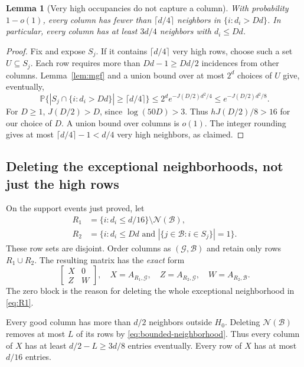 \documentclass[11pt]{article}
\newtheorem{lemma}[theorem]{Lemma}
\theoremstyle{definition}
\theoremstyle{remark}
\newcommand{\PP}{\mathbb P}
\newcommand{\abs}[1]{\left\lvert #1\right\rvert}
\newcommand{\calB}{\mathcal B}
\newcommand{\calG}{\mathcal G}
\newcommand{\calN}{\mathcal N}
\begin{document}
\begin{lemma}[Very high occupancies do not capture a column]\label{lem:cap}
With probability $1-o(1)$, every column has fewer than $\lceil d/4\rceil$ neighbors in $\{i:d_i>Dd\}$. In particular, every column has at least $3d/4$ neighbors with $d_i\leq Dd$.
\end{lemma}
\begin{proof}
Fix and expose $S_j$. If it contains $\lceil d/4\rceil$ very high rows, choose such a set $U\subseteq S_j$. Each row requires more than $Dd-1\geq Dd/2$ incidences from other columns. Lemma~\ref{lem:mgf} and a union bound over at most $2^d$ choices of $U$ give, eventually,
\[
 \PP\{\abs{S_j\cap\{i:d_i>Dd\}}\geq\lceil d/4\rceil\}
 \leq 2^d e^{-J(D/2)d^2/4}
 \leq e^{-J(D/2)d^2/8}.
\]
For $D\geq1$, $J(D/2)>D$, since $\log(50D)>3$. Thus $hJ(D/2)/8>16$ for our choice of $D$. A union bound over columns is $o(1)$. The integer rounding gives at most $\lceil d/4\rceil-1<d/4$ very high neighbors, as claimed.
\end{proof}

\subsection{Deleting the exceptional neighborhoods, not just the high rows}

On the support events just proved, let
\begin{align}
 R_1&=\{i:d_i\leq d/16\}\setminus\calN(\calB),\label{eq:R1}\\
 R_2&=\{i:d_i\leq Dd\text{ and }\abs{\{j\in\calB:i\in S_j\}}=1\}.
 \label{eq:R2}
\end{align}
These row sets are disjoint. Order columns as $(\calG,\calB)$ and retain only rows $R_1\cup R_2$. The resulting matrix has the \emph{exact} form
\begin{equation}\label{eq:block}
 \begin{bmatrix}X&0\\Z&W\end{bmatrix},
 \quad X=A_{R_1,\calG},\quad Z=A_{R_2,\calG},\quad W=A_{R_2,\calB}.
\end{equation}
The zero block is the reason for deleting the whole exceptional neighborhood in \eqref{eq:R1}.

Every good column has more than $d/2$ neighbors outside $H_0$. Deleting $\calN(\calB)$ removes at most $L$ of its rows by \eqref{eq:bounded-neighborhood}. Thus every column of $X$ has at least $d/2-L\geq3d/8$ entries eventually. Every row of $X$ has at most $d/16$ entries.
\end{document}
